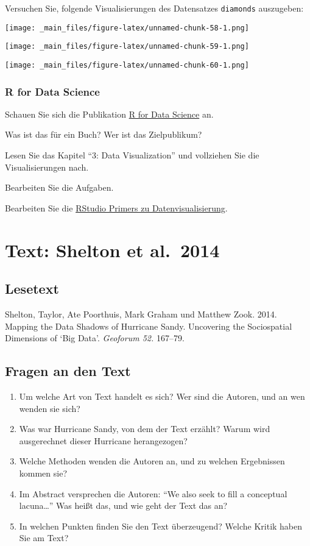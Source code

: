 \documentclass[
  ngerman,
]{article}
\providecommand{\tightlist}{%
  \setlength{\itemsep}{0pt}\setlength{\parskip}{0pt}}
\begin{document}
Versuchen Sie, folgende Visualisierungen des Datensatzes \texttt{diamonds} auszugeben:

\texttt{[image: \_main\_files/figure-latex/unnamed-chunk-58-1.png]}

\texttt{[image: \_main\_files/figure-latex/unnamed-chunk-59-1.png]}

\texttt{[image: \_main\_files/figure-latex/unnamed-chunk-60-1.png]}

\hypertarget{r-for-data-science}{%
\subsubsection{R for Data Science}\label{r-for-data-science}}

Schauen Sie sich die Publikation \href{https://r4ds.had.co.nz/}{R for Data Science} an.

Was ist das für ein Buch? Wer ist das Zielpublikum?

Lesen Sie das Kapitel ``3: Data Visualization'' und vollziehen Sie die Visualisierungen nach.

Bearbeiten Sie die Aufgaben.

Bearbeiten Sie die \href{https://rstudio.cloud/learn/primers/3}{RStudio Primers zu Datenvisualisierung}.

\hypertarget{text-shelton-et-al.-2014}{%
\section{Text: Shelton et al.~2014}\label{text-shelton-et-al.-2014}}

\hypertarget{lesetext-1}{%
\subsection{Lesetext}\label{lesetext-1}}

Shelton, Taylor, Ate Poorthuis, Mark Graham und Matthew Zook. 2014. Mapping the Data Shadows of Hurricane Sandy. Uncovering the Sociospatial Dimensions of `Big Data'. \emph{Geoforum 52.} 167--79.

\hypertarget{fragen-an-den-text-1}{%
\subsection{Fragen an den Text}\label{fragen-an-den-text-1}}

\begin{enumerate}
\def\labelenumi{\arabic{enumi}.}
\tightlist
\item
  Um welche Art von Text handelt es sich? Wer sind die Autoren, und an wen wenden sie sich?
\item
  Was war Hurricane Sandy, von dem der Text erzählt? Warum wird ausgerechnet dieser Hurricane herangezogen?
\item
  Welche Methoden wenden die Autoren an, und zu welchen Ergebnissen kommen sie?
\item
  Im Abstract versprechen die Autoren: ``We also seek to fill a conceptual lacuna\ldots{}'' Was heißt das, und wie geht der Text das an?
\item
  In welchen Punkten finden Sie den Text überzeugend? Welche Kritik haben Sie am Text?
\end{enumerate}
\end{document}
